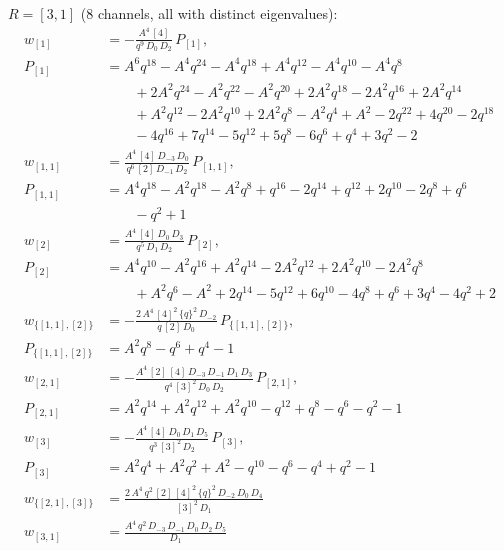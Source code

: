 \documentclass[11pt]{article}
\begin{document}
\noindent $R = [3,1]$ ($8$ channels, all with distinct eigenvalues):
\begin{align*}
w_{[1]} &= -\frac{A^{4}\,[4]}{q^{9}\,D_{0}\,D_{2}}\,P_{[1]}, \\
 P_{[1]} &= A^{6}q^{18}-A^{4}q^{24}-A^{4}q^{18}+A^{4}q^{12}-A^{4}q^{10}-A^{4}q^{8} \\
 &\qquad +2A^{2}q^{24}-A^{2}q^{22}-A^{2}q^{20}+2A^{2}q^{18}-2A^{2}q^{16}+2A^{2}q^{14} \\
 &\qquad +A^{2}q^{12}-2A^{2}q^{10}+2A^{2}q^{8}-A^{2}q^{4}+A^{2}-2q^{22}+4q^{20}-2q^{18} \\
 &\qquad -4q^{16}+7q^{14}-5q^{12}+5q^{8}-6q^{6}+q^{4}+3q^{2}-2 \\
w_{[1,1]} &= \frac{A^{4}\,[4]\,D_{-3}\,D_{0}}{q^{6}\,[2]\,D_{-1}\,D_{2}}\,P_{[1,1]}, \\
 P_{[1,1]} &= A^{4}q^{18}-A^{2}q^{18}-A^{2}q^{8}+q^{16}-2q^{14}+q^{12}+2q^{10}-2q^{8}+q^{6} \\
 &\qquad -q^{2}+1 \\
w_{[2]} &= \frac{A^{4}\,[4]\,D_{0}\,D_{3}}{q^{5}\,D_{1}\,D_{2}}\,P_{[2]}, \\
 P_{[2]} &= A^{4}q^{10}-A^{2}q^{16}+A^{2}q^{14}-2A^{2}q^{12}+2A^{2}q^{10}-2A^{2}q^{8} \\
 &\qquad +A^{2}q^{6}-A^{2}+2q^{14}-5q^{12}+6q^{10}-4q^{8}+q^{6}+3q^{4}-4q^{2}+2 \\
w_{\{[1,1],[2]\}} &= -\frac{2\,A^{4}\,[4]^{2}\,\{q\}^{2}\,D_{-2}}{q\,[2]\,D_{0}}\,P_{\{[1,1],[2]\}}, \\
 P_{\{[1,1],[2]\}} &= A^{2}q^{8}-q^{6}+q^{4}-1 \\
w_{[2,1]} &= -\frac{A^{4}\,[2]\,[4]\,D_{-3}\,D_{-1}\,D_{1}\,D_{3}}{q^{4}\,[3]^{2}\,D_{0}\,D_{2}}\,P_{[2,1]}, \\
 P_{[2,1]} &= A^{2}q^{14}+A^{2}q^{12}+A^{2}q^{10}-q^{12}+q^{8}-q^{6}-q^{2}-1 \\
w_{[3]} &= -\frac{A^{4}\,[4]\,D_{0}\,D_{1}\,D_{5}}{q^{3}\,[3]^{2}\,D_{2}}\,P_{[3]}, \\
 P_{[3]} &= A^{2}q^{4}+A^{2}q^{2}+A^{2}-q^{10}-q^{6}-q^{4}+q^{2}-1 \\
w_{\{[2,1],[3]\}} &= \frac{2\,A^{4}\,q^{2}\,[2]\,[4]^{2}\,\{q\}^{2}\,D_{-2}\,D_{0}\,D_{4}}{[3]^{2}\,D_{1}} \\
w_{[3,1]} &= \frac{A^{4}\,q^{2}\,D_{-3}\,D_{-1}\,D_{0}\,D_{2}\,D_{5}}{D_{1}} \\
\end{align*}
\end{document}
